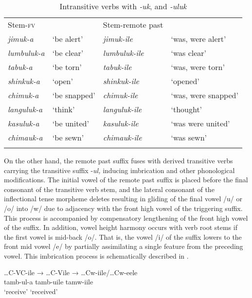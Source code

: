 \documentclass[output=paper]{langsci/langscibook}
\begin{document}
\begin{table}
\begin{tabular}{llll}
\lsptoprule
Stem-\textsc{fv} &  & Stem-remote past & \\
\textit{jimuk-a} & `be alert' & \textit{jimuk-ile} & `was, were alert' \\
\textit{lumbuluk-a} & `be clear' & \textit{lumbuluk-ile} & `was clear' \\
\textit{tabuk-a} & `be torn' & \textit{tabuk-ile} & `was, were torn' \\
\textit{shinkuk-a} & `open' & \textit{shinkuk-ile} & `opened' \\
\textit{chimuk-a} & `be snapped' & \textit{chimuk-ile} & `was, were snapped' \\
\textit{languluk-a} & `think' & \textit{languluk-ile} & `thought' \\
\textit{kasuluk-a} & `be united' & \textit{kasuluk-ile} & `was were united' \\
\textit{chimauk-a} & `be sewn' & \textit{chimauk-ile} & `was sewn' \\

\lspbottomrule
\end{tabular}

\caption{Intransitive verbs with \textit{-uk}, and \textit{-uluk}}
\label{tab:22.kawasha}

\end{table}



On the other hand, the remote past suffix fuses with derived transitive verbs carrying the transitive suffix -\textit{ul,} inducing imbrication and other phonological modifications. The initial vowel of the remote past suffix is placed before the final consonant of the transitive verb stem, and the lateral consonant of the inflectional tense morpheme deletes resulting in gliding of the final vowel /u/ or /o/ into /w/ due to adjacency with the front high vowel of the triggering suffix. This process is accompanied by compensatory lengthening of the front high vowel of the suffix. In addition, vowel height harmony occurs with verb root stems if the first vowel is mid-back /o/. That is, the vowel /i/ of the suffix lowers to the front mid vowel /e/ by partially assimilating a single feature from the preceding vowel. This imbrication process is schematically described in .

\ea
\label{ex:7.kawasha}

\glll …C-VC-ile  →  …C-Vile  →  …Cw-iile/…Cw-eele \\
tamb-ul-a {}   tamb-uile {}   tamw-iile \\
‘receive’ {} {} {} ‘received’ \\
\end{document}
